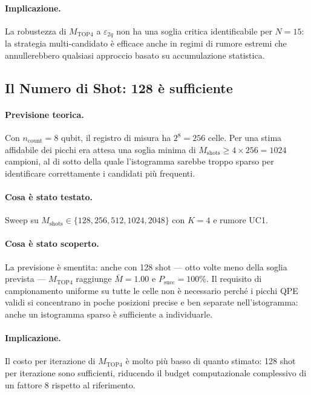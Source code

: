 \begin{onehalfspace}
\paragraph{Implicazione.}
La robustezza di $M_{\text{TOP4}}$ a $\varepsilon_{2q}$ non ha una soglia critica identificabile per $N=15$: la strategia multi-candidato è efficace anche in regimi di rumore estremi che annullerebbero qualsiasi approccio basato su accumulazione statistica.

\subsection{Il Numero di Shot: 128 è sufficiente}

\paragraph{Previsione teorica.}
Con $n_{\text{count}}=8$ qubit, il registro di misura ha $2^8=256$ celle. Per una stima affidabile dei picchi era attesa una soglia minima di $M_{\text{shots}} \geq 4 \times 256 = 1024$ campioni, al di sotto della quale l'istogramma sarebbe troppo sparso per identificare correttamente i candidati più frequenti.

\paragraph{Cosa è stato testato.}
Sweep su $M_{\text{shots}} \in \{128, 256, 512, 1024, 2048\}$ con $K=4$ e rumore UC1.

\paragraph{Cosa è stato scoperto.}
La previsione è smentita: anche con 128 shot — otto volte meno della soglia prevista — $M_{\text{TOP4}}$ raggiunge $\bar{M}=1.00$ e $P_{\text{succ}}=100\%$. Il requisito di campionamento uniforme su tutte le celle non è necessario perché i picchi QPE validi si concentrano in poche posizioni precise e ben separate nell'istogramma: anche un istogramma sparso è sufficiente a individuarle.

\paragraph{Implicazione.}
Il costo per iterazione di $M_{\text{TOP4}}$ è molto più basso di quanto stimato: 128 shot per iterazione sono sufficienti, riducendo il budget computazionale complessivo di un fattore 8 rispetto al riferimento.


\end{onehalfspace}
